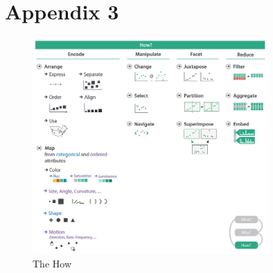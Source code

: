 \section{Appendix 3} \label{app:www-how}

\begin{figure}[h]
  \centering
  \includegraphics[width=0.8\textwidth]{Images/www/how.png}
  \caption{The How}
  \label{fig:www-what}
\end{figure}

\newpage